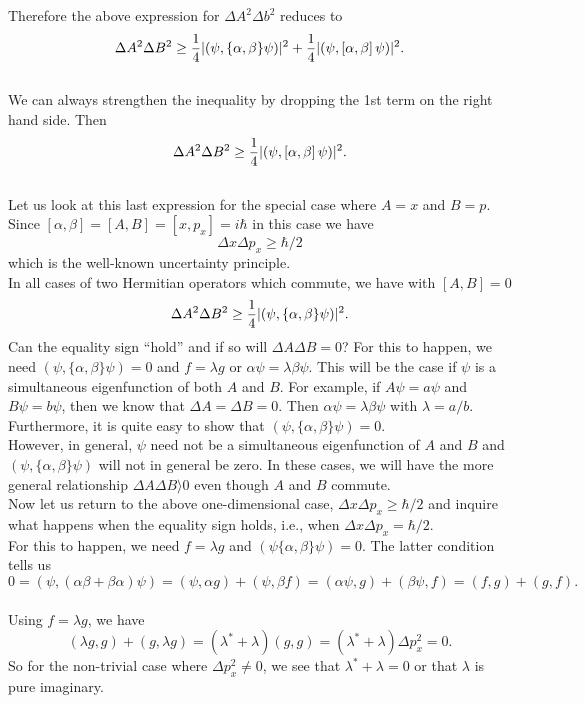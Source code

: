     Therefore the above expression for $\Delta A^2\Delta b^2$ reduces to 
   $$ \Delta A^2 \Delta B^2 \ge {1\over 4} |(\psi,\{ \alpha, \beta\}\psi)|^2 + {1\over4}|(\psi, \left[ \alpha,\beta\right]\psi)|^2.$$\\
   We can always strengthen the inequality by dropping the 1st term on the right hand side. Then
   $$\Delta A^2 \Delta B^2 \ge {1\over 4} |(\psi, \left[ \alpha,\beta\right]\psi)|^2.$$\\
   Let us look at this last expression for the special case where $A=x$ and $B=p$.\\
   Since $\left[\alpha,\beta\right] = \left[A,B\right] = \left[x,p_x\right] = i\hbar$ in this case we have
   $$\Delta x\Delta p_x \ge \hbar/2$$ which is the well-known uncertainty principle. \\
   In all cases of two Hermitian operators which commute, we have with $\left[A,B\right] = 0$ 
   $$\Delta A^2 \Delta B^2 \ge {1\over4}| (\psi,\{\alpha,\beta\}\psi)|^2.$$
   Can the equality sign ``hold'' and if so will $\Delta A\Delta B = 0$? For this to happen, we need $(\psi,\{\alpha,\beta\}\psi) = 0$ and $f = \lambda g$ or $\alpha \psi = \lambda \beta \psi$. This will be the case if
   $\psi$ is  a simultaneous eigenfunction of both $A$ and $B$. For example, if $A\psi = a\psi$ and $B\psi =b\psi$, then we know that $\Delta A = \Delta B = 0$. Then $\alpha \psi = \lambda\beta\psi$ with
   $\lambda = a/b$. Furthermore, it is quite easy to show that $(\psi,\{\alpha,\beta\}\psi) = 0$. \\
   However, in general, $\psi$ need not be a simultaneous eigenfunction of $A$ and $B$ and $(\psi,\{\alpha,\beta\}\psi)$ will not in general be zero. In these cases, we will have the more general 
   relationship $\Delta A\Delta B \rangle  0$ even though $A$  and $B$ commute. \\
   Now let us return to the above one-dimensional case, $\Delta x \Delta p_x \ge \hbar/2$ and inquire what happens when the equality sign holds, i.e., when $\Delta x\Delta p_x = \hbar/2$.\\   
   For this to happen, we need $f=\lambda g$ and $(\psi\{\alpha,\beta\}\psi) = 0$. The latter condition tells us 
   \[ 0 = (\psi,(\alpha\beta + \beta\alpha)\psi) = (\psi,\alpha g) + (\psi,\beta f) = (\alpha\psi,g) + (\beta\psi,f) = (f,g) + (g,f).\]\\
   Using $f=\lambda g$, we have
   \[ (\lambda g,g) + (g,\lambda g) = (\lambda^* + \lambda) (g,g) = (\lambda^* + \lambda)\Delta p_x^2 = 0.\]
   So for the non-trivial case where $\Delta p_x^2 \ne 0$, we see that $\lambda^* + \lambda = 0$ or that $\lambda$ is pure imaginary. \\

